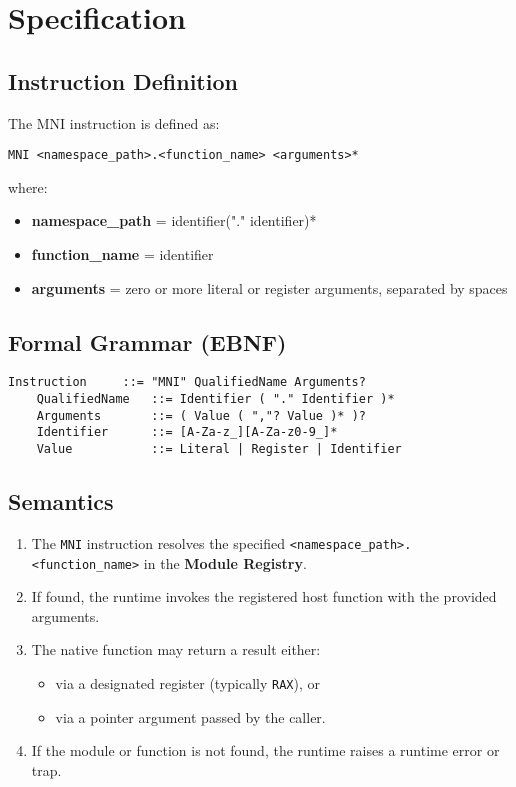 \documentclass[11pt]{article}
\begin{document}
	\section{Specification}

	\subsection{Instruction Definition}
	The MNI instruction is defined as:

	\begin{lstlisting}[language=MicroASM]
	MNI <namespace_path>.<function_name> <arguments>*
	\end{lstlisting}

	where:
	\begin{itemize}
		\item \textbf{namespace\_path} = identifier("." identifier)*
		\item \textbf{function\_name} = identifier
		\item \textbf{arguments} = zero or more literal or register arguments, separated by spaces
	\end{itemize}

	\subsection{Formal Grammar (EBNF)}
	\begin{lstlisting}[language=MicroASM]
	Instruction     ::= "MNI" QualifiedName Arguments?
	QualifiedName   ::= Identifier ( "." Identifier )*
	Arguments       ::= ( Value ( ","? Value )* )?
	Identifier      ::= [A-Za-z_][A-Za-z0-9_]*
	Value           ::= Literal | Register | Identifier
	\end{lstlisting}

	\subsection{Semantics}
	\begin{enumerate}
		\item The \texttt{MNI} instruction resolves the specified \texttt{<namespace\_path>.<function\_name>} in the \textbf{Module Registry}.
		\item If found, the runtime invokes the registered host function with the provided arguments.
		\item The native function may return a result either:
		\begin{itemize}
			\item via a designated register (typically \texttt{RAX}), or
			\item via a pointer argument passed by the caller.
		\end{itemize}
		\item If the module or function is not found, the runtime raises a runtime error or trap.
	\end{enumerate}
\end{document}

